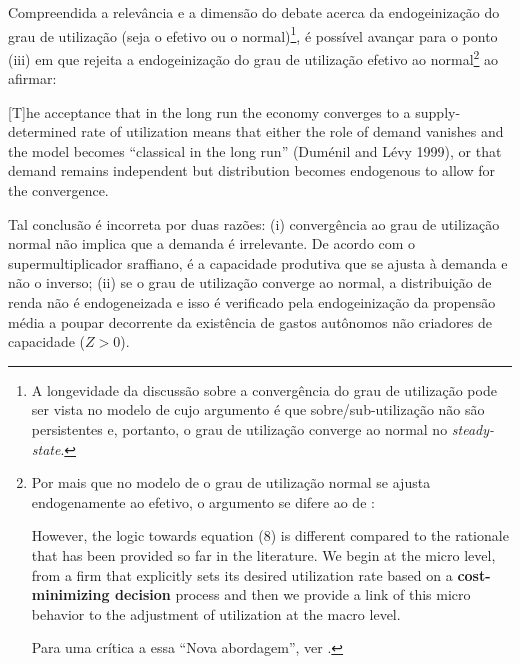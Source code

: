 Compreendida a relevância e a dimensão do debate acerca da endogeinização do grau de utilização (seja o efetivo ou o normal)\footnote{
	A longevidade da discussão sobre a convergência do grau de utilização pode ser vista no modelo de \textcite{vianello_pace_1985} cujo argumento é que sobre/sub-utilização não são persistentes e, portanto, o grau de utilização converge ao normal no \textit{steady-state}.
}, é possível avançar para o ponto (iii) em que \citeauthor*{nikiforos_comments_2018} rejeita a endogeinização do grau de utilização efetivo ao normal\footnote{
	Por mais que no modelo de \textcite{nikiforos_utilization_2016} o grau de utilização normal se ajusta endogenamente ao efetivo, o argumento se difere ao de \textcite{amadeo_role_1986}:
	
	\begin{citacao}
		However, the logic towards equation (8) is different compared to the rationale that has been provided so far in the literature. We begin at the micro level, from a firm that explicitly sets its desired utilization rate based on a \textbf{cost-minimizing decision} process and then we provide a link of this micro behavior to the adjustment of utilization at the macro level. \cite[p.~456, grifos adicionados e numeração adaptada]{nikiforos_utilization_2016}
	\end{citacao}
	Para uma crítica a essa ``Nova abordagem'', ver \textcite{girardi_normal_2018}.
	
} ao afirmar:

\begin{citacao}
	
	[T]he acceptance that in the long run the economy converges to a supply-determined rate of utilization means that either the role of demand vanishes and the model becomes ``classical in the long run'' (Duménil and Lévy 1999), or that demand remains independent but distribution becomes endogenous to allow for the convergence. \cite[p.~9]{nikiforos_comments_2018}
\end{citacao}
Tal conclusão é incorreta por duas razões: (i) convergência ao grau de utilização normal não implica que a demanda é irrelevante. De acordo com o supermultiplicador sraffiano, é a capacidade produtiva que se ajusta à demanda e não o inverso; (ii) se o grau de utilização converge ao normal, a distribuição de renda não é endogeneizada e isso é verificado pela endogeinização da propensão média a poupar decorrente da existência de gastos autônomos não criadores de capacidade ($Z>0$).

